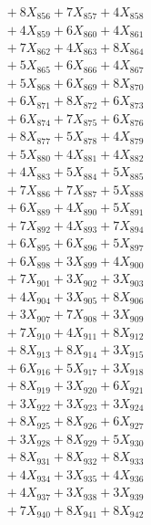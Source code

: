 \documentclass[a4paper,10pt]{article}
\begin{document}
{\begin{align}
&\;  + 8 X_{856} + 7 X_{857} + 4 X_{858} \\[0.3ex]
&\;  + 4 X_{859} + 6 X_{860} + 4 X_{861} \\[0.3ex]
&\;  + 7 X_{862} + 4 X_{863} + 8 X_{864} \\[0.3ex]
&\;  + 5 X_{865} + 6 X_{866} + 4 X_{867} \\[0.3ex]
&\;  + 5 X_{868} + 6 X_{869} + 8 X_{870} \\[0.3ex]
&\;  + 6 X_{871} + 8 X_{872} + 6 X_{873} \\[0.3ex]
&\;  + 6 X_{874} + 7 X_{875} + 6 X_{876} \\[0.3ex]
&\;  + 8 X_{877} + 5 X_{878} + 4 X_{879} \\[0.5ex]\allowbreak
&\;  + 5 X_{880} + 4 X_{881} + 4 X_{882} \\[0.3ex]
&\;  + 4 X_{883} + 5 X_{884} + 5 X_{885} \\[0.3ex]
&\;  + 7 X_{886} + 7 X_{887} + 5 X_{888} \\[0.3ex]
&\;  + 6 X_{889} + 4 X_{890} + 5 X_{891} \\[0.3ex]
&\;  + 7 X_{892} + 4 X_{893} + 7 X_{894} \\[0.3ex]
&\;  + 6 X_{895} + 6 X_{896} + 5 X_{897} \\[0.3ex]
&\;  + 6 X_{898} + 3 X_{899} + 4 X_{900} \\[0.3ex]
&\;  + 7 X_{901} + 3 X_{902} + 3 X_{903} \\[0.3ex]
&\;  + 4 X_{904} + 3 X_{905} + 8 X_{906} \\[0.3ex]
&\;  + 3 X_{907} + 7 X_{908} + 3 X_{909} \\[0.5ex]\allowbreak
&\;  + 7 X_{910} + 4 X_{911} + 8 X_{912} \\[0.3ex]
&\;  + 8 X_{913} + 8 X_{914} + 3 X_{915} \\[0.3ex]
&\;  + 6 X_{916} + 5 X_{917} + 3 X_{918} \\[0.3ex]
&\;  + 8 X_{919} + 3 X_{920} + 6 X_{921} \\[0.3ex]
&\;  + 3 X_{922} + 3 X_{923} + 3 X_{924} \\[0.3ex]
&\;  + 8 X_{925} + 8 X_{926} + 6 X_{927} \\[0.3ex]
&\;  + 3 X_{928} + 8 X_{929} + 5 X_{930} \\[0.3ex]
&\;  + 8 X_{931} + 8 X_{932} + 8 X_{933} \\[0.3ex]
&\;  + 4 X_{934} + 3 X_{935} + 4 X_{936} \\[0.3ex]
&\;  + 4 X_{937} + 3 X_{938} + 3 X_{939} \\[0.5ex]\allowbreak
&\;  + 7 X_{940} + 8 X_{941} + 8 X_{942} \\[0.3ex]

\end{align}}
\end{document}
